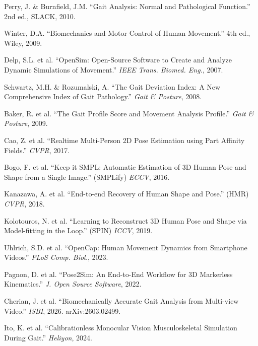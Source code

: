 \documentclass[11pt, a4paper]{report}
\begin{document}
\begin{enumerate}[leftmargin=*, label={[\arabic*]}]
  \item Perry, J. \& Burnfield, J.M. ``Gait Analysis: Normal and Pathological Function.'' 2nd ed., SLACK, 2010.

  \item Winter, D.A. ``Biomechanics and Motor Control of Human Movement.'' 4th ed., Wiley, 2009.

  \item Delp, S.L. et al. ``OpenSim: Open-Source Software to Create and Analyze Dynamic Simulations of Movement.'' \textit{IEEE Trans. Biomed. Eng.}, 2007.

  \item Schwartz, M.H. \& Rozumalski, A. ``The Gait Deviation Index: A New Comprehensive Index of Gait Pathology.'' \textit{Gait \& Posture}, 2008.

  \item Baker, R. et al. ``The Gait Profile Score and Movement Analysis Profile.'' \textit{Gait \& Posture}, 2009.

  \item Cao, Z. et al. ``Realtime Multi-Person 2D Pose Estimation using Part Affinity Fields.'' \textit{CVPR}, 2017.

  \item Bogo, F. et al. ``Keep it SMPL: Automatic Estimation of 3D Human Pose and Shape from a Single Image.'' (SMPLify) \textit{ECCV}, 2016.

  \item Kanazawa, A. et al. ``End-to-end Recovery of Human Shape and Pose.'' (HMR) \textit{CVPR}, 2018.

  \item Kolotouros, N. et al. ``Learning to Reconstruct 3D Human Pose and Shape via Model-fitting in the Loop.'' (SPIN) \textit{ICCV}, 2019.

  \item Uhlrich, S.D. et al. ``OpenCap: Human Movement Dynamics from Smartphone Videos.'' \textit{PLoS Comp. Biol.}, 2023.

  \item Pagnon, D. et al. ``Pose2Sim: An End-to-End Workflow for 3D Markerless Kinematics.'' \textit{J. Open Source Software}, 2022.

  \item Cherian, J. et al. ``Biomechanically Accurate Gait Analysis from Multi-view Video.'' \textit{ISBI}, 2026. arXiv:2603.02499.

  \item Ito, K. et al. ``Calibrationless Monocular Vision Musculoskeletal Simulation During Gait.'' \textit{Heliyon}, 2024.


\end{enumerate}
\end{document}
